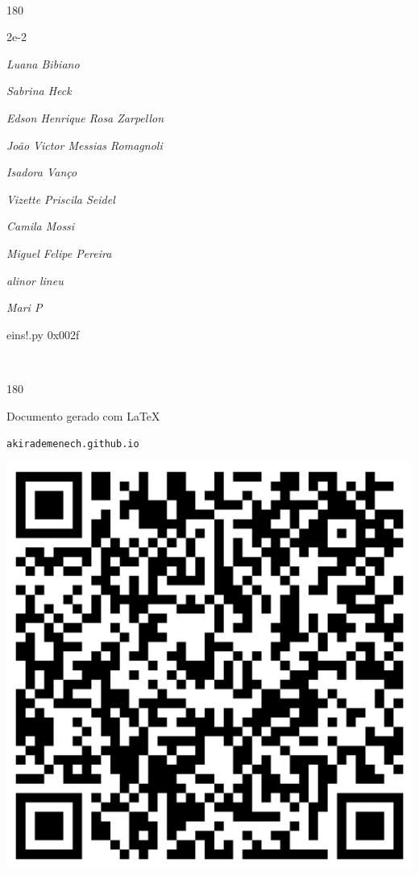 \documentclass[12pt]{article}
\begin{document}
\pagebreak			

	\ 
	\vfill
	\begin{turn}{180}	
		\begin{minipage}{\textwidth}
		  	\ttfamily %
			\centering
			{\Huge 2e-2}
		  
			\hfill
		  
			

\textit{\small Luana Bibiano}

\textit{\small Sabrina Heck}

\textit{\small Edson Henrique Rosa Zarpellon}

\textit{\small João Victor Messias Romagnoli}

\textit{\small Isadora Vanço}

\textit{\small Vizette Priscila Seidel}

\textit{\small Camila Mossi}

\textit{\small Miguel Felipe Pereira}

\textit{\small alinor lineu}

\textit{\small Mari P}

\bigskip

eins!.py
0x002f


		\end{minipage}	
	\end{turn}
	\vfill
	\

\pagebreak

	\begin{turn}{180}	
		\begin{minipage}{\textwidth}		  
		  Documento gerado com \LaTeX			
		  
		  \texttt{akirademenech.github.io}

		  \includegraphics[height=0.3\textheight]{2e-2.pdf}

		\end{minipage}	
	\end{turn}  
		  
\end{document}
